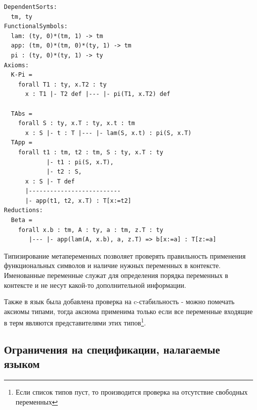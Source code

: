 \begin{lstlisting}
DependentSorts:
  tm, ty
FunctionalSymbols:
  lam: (ty, 0)*(tm, 1) -> tm
  app: (tm, 0)*(tm, 0)*(ty, 1) -> tm
  pi : (ty, 0)*(ty, 1) -> ty
Axioms:
  K-Pi =
    forall T1 : ty, x.T2 : ty
      x : T1 |- T2 def |--- |- pi(T1, x.T2) def

  TAbs =
    forall S : ty, x.T : ty, x.t : tm
      x : S |- t : T |--- |- lam(S, x.t) : pi(S, x.T)
  TApp =
    forall t1 : tm, t2 : tm, S : ty, x.T : ty
            |- t1 : pi(S, x.T),
            |- t2 : S,
      x : S |- T def
      |--------------------------
      |- app(t1, t2, x.T) : T[x:=t2]
Reductions:
  Beta =
    forall x.b : tm, A : ty, a : tm, z.T : ty
       |--- |- app(lam(A, x.b), a, z.T) => b[x:=a] : T[z:=a]

\end{lstlisting}

Типизирование метапеременных позволяет проверять правильность применения функциональных символов и наличие нужных переменных в контексте. Именованные переменные служат для определения порядка переменных в контексте и не несут какой-то дополнительной информации.

Также в язык была добавлена проверка на c-стабильность - можно помечать аксиомы типами, тогда аксиома применима только если все переменные входящие в терм являются представителями этих типов\footnote{Если список типов пуст, то производится проверка на отсутствие свободных переменных}.

\subsection{Ограничения на спецификации, налагаемые языком}

